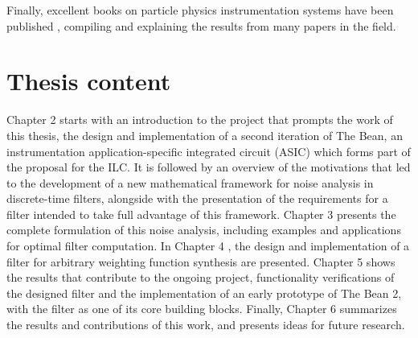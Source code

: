 Finally, excellent books on particle physics instrumentation systems have been published \citep{radeka201}, compiling and explaining the results from many papers in the field.


\section{Thesis content}
Chapter 2 starts with an introduction to the project that prompts the work of this thesis, the design and implementation of a second iteration of The Bean, an instrumentation application-specific integrated circuit (ASIC) which forms part of the proposal for the ILC. It is followed by an overview of the motivations that led to the development of a new mathematical framework for noise analysis in discrete-time filters, alongside with the presentation of the requirements for a filter intended to take full advantage of this framework. Chapter 3 presents the complete formulation of this noise analysis, including examples and applications for optimal filter computation. In Chapter 4 , the design and implementation of a filter for arbitrary weighting function synthesis are presented. Chapter 5 shows the results that contribute to the ongoing project, functionality verifications of the designed filter and the implementation of an early prototype of The Bean 2, with the filter as one of its core building blocks. Finally, Chapter 6 summarizes the results and contributions of this work, and presents ideas for future research.